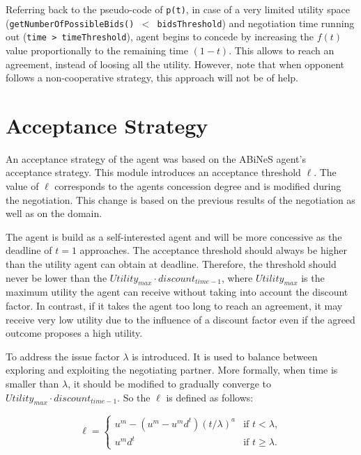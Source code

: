 \documentclass[html]{report}    %
\begin{document}
Referring back to the pseudo-code of \texttt{p(t)}, in case of a very limited utility space (\texttt{getNumberOfPossibleBids()~$<$~bidsThreshold}) and negotiation time running out (\texttt{time > timeThreshold}), agent begins to concede by increasing the $f(t)$ value proportionally to the remaining time $(1-t)$. This allows to reach an agreement, instead of loosing all the utility. However, note that when opponent follows a non-cooperative strategy, this approach will not be of help.                

\section{Acceptance Strategy}
              
An acceptance strategy of the agent was based on the ABiNeS agent's ~\cite{abines} acceptance strategy. This module introduces an acceptance threshold $\ell$. The value of $\ell$ corresponds to the agents concession degree and is modified during the negotiation. This change is based on the previous results of the negotiation as well as on the domain.

The agent is build as a self-interested agent and will be more concessive as the deadline of $t=1$ approaches. The acceptance threshold should always be higher than the utility agent can obtain at deadline. Therefore, the threshold should never be lower than the \(Utility_{max}\cdot discount_{time-1}\), where \( Utility_{max}\) is the maximum utility the agent can receive without taking into account the discount factor. In contrast, if it takes the agent too long to reach an agreement, it may receive very low utility due to the influence of a discount factor even if the agreed outcome proposes a high utility. 

To address the issue factor $\lambda$ is introduced. It is used to balance between exploring and exploiting the negotiating partner. More formally, when time is smaller than $\lambda$, it should be modified to gradually converge to \( Utility_{max}\cdot discount_{time-1}  \). So the $\ell$ is defined as follows:

\begin{equation} \label{2}
	\ell =	\begin{cases}
	    	u^m -(u^m-	u^md^t)(t/\lambda)^a  & \mbox{if } t < \lambda, \\
	   		u^m d^t & \mbox{if } t \geq \lambda.
			\end{cases}
\end{equation}
\end{document}
